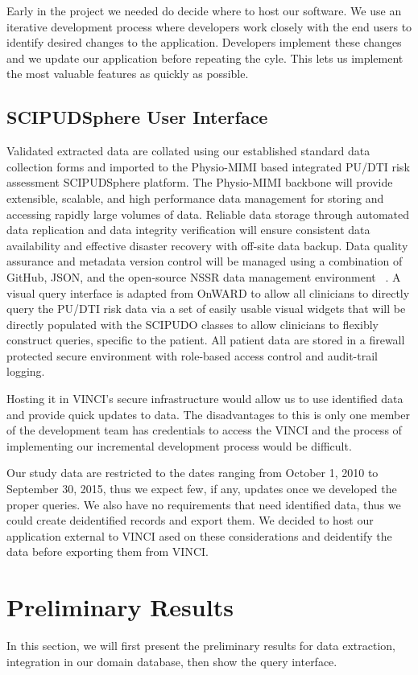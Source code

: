 \documentclass{amia}
\begin{document}
Early in the project we needed do decide where to host our software. We use an iterative development process where developers work closely with the end users to identify desired changes to the application. Developers implement these changes and we update our application before repeating the cyle. This lets us implement the most valuable features as quickly as possible.

\subsection{SCIPUDSphere User Interface}
Validated extracted data are collated using our established standard data collection forms and imported to the Physio-MIMI based integrated PU/DTI risk assessment SCIPUDSphere platform. The Physio-MIMI backbone will provide extensible, scalable, and high performance data management for storing and accessing rapidly large volumes of data. Reliable data storage through automated data replication and data integrity verification will ensure consistent data availability and effective disaster recovery with off-site data backup. Data quality assurance and metadata version control will be managed using a combination of GitHub, JSON, and the open-source NSSR data management environment ~\cite{nsrr}. A visual query interface is adapted from OnWARD to allow all clinicians to directly query the PU/DTI risk data via a set of easily usable visual widgets that will be directly populated with the SCIPUDO classes to allow clinicians to flexibly construct queries, specific to the patient. All patient data are stored in a firewall protected secure environment with role-based access control and audit-trail logging. 

Hosting it in VINCI's secure infrastructure would allow us to use identified data and provide quick updates to data. The disadvantages to this is only one member of the development team has credentials to access the VINCI and the process of implementing our incremental development process would be difficult.

Our study data are restricted to the dates ranging from October 1, 2010 to September 30, 2015, thus we expect few, if any, updates once we developed the proper queries.  We also have no requirements that need identified data, thus we could create deidentified records and export them.  We decided to host our application external to VINCI ased on these considerations and deidentify the data before exporting them from VINCI.

\section{Preliminary Results}
In this section, we will first present the preliminary results for data extraction, integration in our domain database, then show the query interface.  
\end{document}
